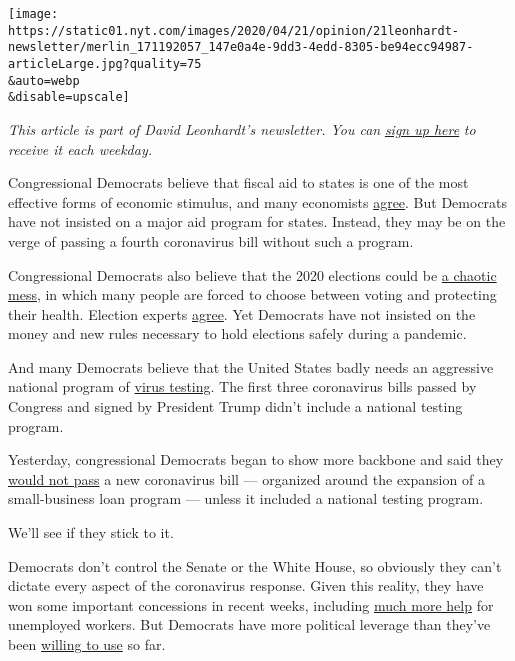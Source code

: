 \texttt{[image: https://static01.nyt.com/images/2020/04/21/opinion/21leonhardt-newsletter/merlin\_171192057\_147e0a4e-9dd3-4edd-8305-be94ecc94987-articleLarge.jpg?quality=75\\\&auto=webp\\\&disable=upscale]}

\emph{This article is part of David Leonhardt's newsletter. You can}
\href{https://www.nytimes.com/newsletters/opiniontoday?action=click\&module=Intentional\&pgtype=Article}{\emph{sign
up here}} \emph{to receive it each weekday.}

Congressional Democrats believe that fiscal aid to states is one of the
most effective forms of economic stimulus, and many economists
\href{https://www.economy.com/mark-zandi/documents/Stimulus-Impact-2008.pdf}{agree}.
But Democrats have not insisted on a major aid program for states.
Instead, they may be on the verge of passing a fourth coronavirus bill
without such a program.

Congressional Democrats also believe that the 2020 elections could be
\href{https://www.nytimes.com/2020/04/03/opinion/wisconsin-primary-coronavirus.html}{a
chaotic mess}, in which many people are forced to choose between voting
and protecting their health. Election experts
\href{https://electionlawblog.org/?p=110034}{agree}. Yet Democrats have
not insisted on the money and new rules necessary to hold elections
safely during a pandemic.

And many Democrats believe that the United States badly needs an
aggressive national program of
\href{https://www.nytimes.com/2020/04/06/health/coronavirus-testing-us.html}{virus
testing}. The first three coronavirus bills passed by Congress and
signed by President Trump didn't include a national testing program.

Yesterday, congressional Democrats began to show more backbone and said
they
\href{https://www.nytimes.com/2020/04/20/us/politics/congress-coronavirus-bill.html}{would
not pass} a new coronavirus bill --- organized around the expansion of a
small-business loan program --- unless it included a national testing
program.

We'll see if they stick to it.

Democrats don't control the Senate or the White House, so obviously they
can't dictate every aspect of the coronavirus response. Given this
reality, they have won some important concessions in recent weeks,
including
\href{https://www.nytimes.com/2020/03/25/us/politics/coronavirus-senate-deal.html}{much
more help} for unemployed workers. But Democrats have more political
leverage than they've been
\href{https://www.nytimes.com/2020/04/06/opinion/coronavirus-stimulus-democrats.html}{willing
to use} so far.

